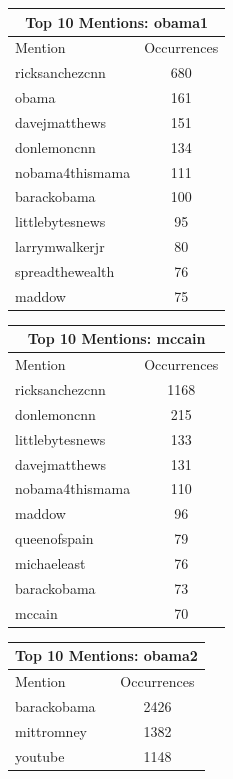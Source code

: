 \documentclass[12pt,a4paper]{report}
\begin{document}
  \begin{table}[ht]
    \centering
    \begin{tabular}[t]{|l|c|}
      \hline
      \multicolumn{2}{|c|}{Top 10 Mentions: obama1} \\
      \hline
      \hline
      Mention & Occurrences \\ 
      \hline
      ricksanchezcnn & 680 \\
      obama & 161 \\
      davejmatthews & 151 \\
      donlemoncnn & 134 \\
      nobama4thismama & 111 \\
      barackobama & 100 \\
      littlebytesnews & 95 \\
      larrymwalkerjr & 80 \\
      spreadthewealth & 76 \\
      maddow & 75 \\
      \hline
    \end{tabular}\hfill%
    \begin{tabular}[t]{|l|c|}
      \hline
      \multicolumn{2}{|c|}{Top 10 Mentions: mccain} \\
      \hline
      \hline
      Mention & Occurrences \\ [0.5ex]
      \hline
      ricksanchezcnn & 1168 \\
      donlemoncnn & 215 \\
      littlebytesnews & 133 \\
      davejmatthews & 131 \\
      nobama4thismama & 110 \\
      maddow & 96 \\
      queenofspain & 79 \\
      michaeleast & 76 \\
      barackobama & 73 \\
      mccain & 70 \\
      \hline
    \end{tabular}\hfill%
    \begin{tabular}[t]{|l|c|}
      \hline
      \multicolumn{2}{|c|}{Top 10 Mentions: obama2} \\
      \hline
      Mention & Occurrences \\ [0.5ex]
      \hline
      \hline
      barackobama & 2426 \\
      mittromney & 1382 \\
      youtube & 1148 \\

\end{tabular}
\end{table}
\end{document}
